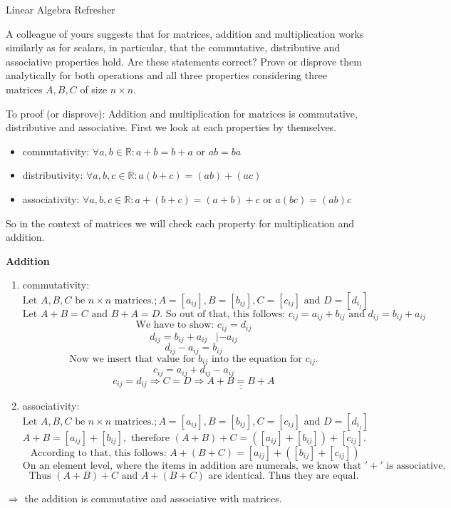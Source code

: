\documentclass[
	english,
        solution=true
	]{tudaexercise}
\newcommand{\R}{\mathbb{R}}
\begin{document}
\begin{task}[points=28]{Linear Algebra Refresher}

    \begin{subtask}[points=5,title=Matrix Properties]
A colleague of yours suggests that for matrices, addition and multiplication
works similarly as for scalars, in particular, that the commutative,
distributive and associative properties hold. Are these statements correct?
Prove or disprove them analytically for both operations and all three
properties considering three matrices $ A, B, C$ of size $n\times n$.

\begin{solution}

To proof (or disprove): Addition and multiplication for matrices is commutative, distributive and associative. First we look at each properties by themselves.\\

\begin{itemize}
    \item commutativity:  $\forall a, b \in \R: a+b=b+a$ or $ab=ba$
    \item distributivity: $\forall a, b, c \in \R: a(b+c) = (ab)+(ac)$
    \item associativity: $\forall a, b, c \in \R: a+(b+c)=(a+b)+c$ or $a(bc)=(ab)c$
\end{itemize}

So in the context of matrices we will check each property for multiplication and addition.

\textbf{Addition}

\begin{enumerate}
    \item commutativity: 
    \[ \text{Let } A, B, C \text{ be } n\times n \text{ matrices.}; A=[a_{ij}], B=[b_{ij}], C=[c_{ij}] \text{ and } D=[d_{i_j}] \]
    \[   \text{Let }A+B=C \text{ and } B+A=D. \text{ So out of that, this follows: } c_{ij} = a_{ij} + b_{ij} \text{ and } d_{ij} = b_{ij} + a_{ij}  \]
    \[\text{We have to show: } c_{ij} = d_{ij}\]
    \[d_{ij}=b_{ij}+a_{ij} \,\,\,\,\, | -a_{ij}\]
    \[d_{ij}-a_{ij}=b_{ij}\]
    \[\text{Now we insert that value for }b_{ij} \text{ into the equation for }c_{ij}.\]
    \[c_{ij}=a_{ij}+d_{ij}-a_{ij}\]
    \[c_{ij}=d_{ij} \Rightarrow C=D \Rightarrow \underline{\underline{A+B=B+A}}\]
    \item associativity:
    \[\text{Let } A, B, C \text{ be } n \times n \text{ matrices.};  A=[a_{ij}], B=[b_{ij}], C=[c_{ij}] \text{ and } D=[d_{i_j}] \]
    \[A+B=[a_{ij}]+[b_{ij}], \text{ therefore } (A+B)+C = ([a_{ij}] + [b_{ij}])+[c_{ij}].\]
    \[\text{ According to that, this follows: }A+(B+C)=[a_{ij}]+([b_{ij}]+[c_{ij}])\]
    \[\text{On an element level, where the items in addition are numerals, we know that }'+' \text{ is associative.}\]
    \[\text{Thus } (A+B)+C \text{ and } A+(B+C) \text{ are identical. Thus they are equal.}\]
\end{enumerate}
$\Rightarrow$ the addition is commutative and associative with matrices.


\end{solution}
\end{subtask}
\end{task}
\end{document}
